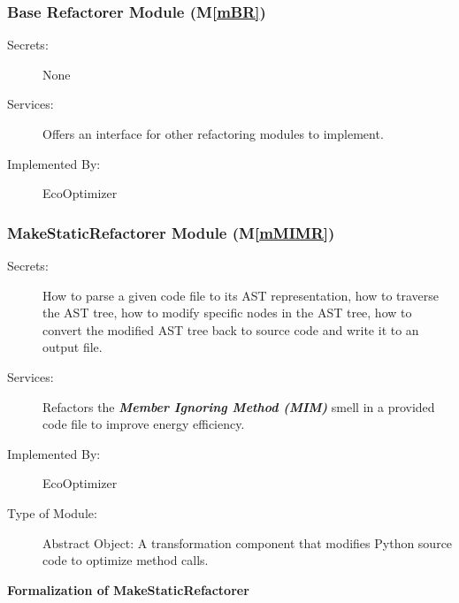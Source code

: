\documentclass[12pt, titlepage]{article}
\newcommand{\mref}[1]{M\ref{#1}}
\begin{document}
\subsubsection{Base Refactorer Module (\mref{mBR})}


\begin{description}
    \item[Secrets:] None
    \item[Services:] Offers an interface for other refactoring modules to implement.
    \item[Implemented By:] EcoOptimizer
\end{description}

\subsubsection{MakeStaticRefactorer Module (\mref{mMIMR})}

\begin{description}
\item[Secrets:] How to parse a given code file to its AST representation, how to traverse the AST tree, how to modify specific nodes in the AST tree, how to convert the modified AST tree back to source code and write it to an output file.
\item[Services:] Refactors the \textit{\textbf{Member Ignoring Method (MIM)}} smell in a provided code file to improve energy efficiency.
\item[Implemented By:] EcoOptimizer
\item[Type of Module:] Abstract Object: A transformation component that modifies Python source code to optimize method calls.
\end{description}

\textbf{Formalization of MakeStaticRefactorer}
\end{document}
